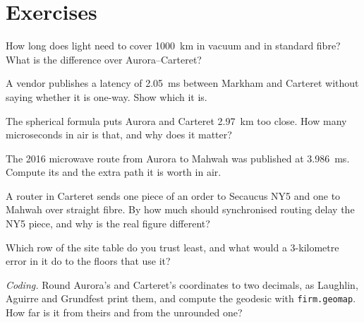 \section{Exercises}

\begin{exercise}[$\star$]\label{exo:nw:the-north-american-map:1}
How long does light need to cover \qty{1000}{\kilo\metre} in vacuum and in standard fibre? What is the difference over Aurora--Carteret?
\end{exercise}

\begin{exercise}[$\star$]\label{exo:nw:the-north-american-map:2}
A vendor publishes a latency of \qty{2.05}{\milli\second} between Markham and Carteret without saying whether it is one-way. Show which it is.
\end{exercise}

\begin{exercise}[$\star$]\label{exo:nw:the-north-american-map:3}
The spherical formula puts Aurora and Carteret \qty{2.97}{\kilo\metre} too close. How many microseconds in air is that, and why does it matter?
\end{exercise}

\begin{exercise}[$\star\star$]\label{exo:nw:the-north-american-map:4}
The 2016 microwave route from Aurora to Mahwah was published at \qty{3.986}{\milli\second}. Compute its  and the extra path it is
worth in air.
\end{exercise}

\begin{exercise}[$\star\star$]\label{exo:nw:the-north-american-map:5}
A router in Carteret sends one piece of an order to Secaucus NY5 and one to Mahwah over straight fibre. By how much should synchronised routing
delay the NY5 piece, and why is the real figure different?
\end{exercise}

\begin{exercise}[$\star\star$]\label{exo:nw:the-north-american-map:6}
Which row of the site table do you trust least, and what would a 3-kilometre error in it do to the floors that use it?
\end{exercise}

\begin{exercise}[$\star\star\star$]\label{exo:nw:the-north-american-map:7}
\emph{Coding.} Round Aurora's and Carteret's coordinates to two decimals, as Laughlin, Aguirre and Grundfest print them, and compute the geodesic
with \texttt{firm.geomap}. How far is it from theirs and from the unrounded one?
\end{exercise}

